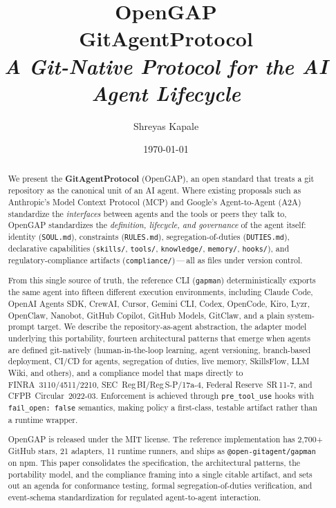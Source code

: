 \documentclass[11pt,a4paper]{article}
\title{\textbf{\Huge OpenGAP} \\[4pt] \large\textbf{GitAgentProtocol} \\[4pt] \normalsize\textit{A Git-Native Protocol for the AI Agent Lifecycle}}
\author[1]{Shreyas Kapale}
\affil[1]{OpenGAP Working Group \\ \texttt{shreyas@lyzr.ai} \\ \href{https://gitagent.sh}{gitagent.sh} \\ \href{https://github.com/open-gitagent/gitagent}{github.com/open-gitagent/gitagent}}
\date{\today}
\begin{document}
\maketitle

\begin{abstract}
\noindent
We present the \textbf{GitAgentProtocol} (OpenGAP), an open standard that treats a
git repository as the canonical unit of an AI agent. Where existing proposals such as
Anthropic's Model Context Protocol (MCP) and Google's Agent-to-Agent (A2A) standardize
the \emph{interfaces} between agents and the tools or peers they talk to, OpenGAP
standardizes the \emph{definition, lifecycle, and governance} of the agent itself:
identity (\texttt{SOUL.md}), constraints (\texttt{RULES.md}), segregation-of-duties
(\texttt{DUTIES.md}), declarative capabilities (\texttt{skills/}, \texttt{tools/},
\texttt{knowledge/}, \texttt{memory/}, \texttt{hooks/}), and regulatory-compliance
artifacts (\texttt{compliance/})\,---\,all as files under version control.

From this single source of truth, the reference CLI (\texttt{gapman}) deterministically
exports the same agent into fifteen different execution environments, including Claude
Code, OpenAI Agents SDK, CrewAI, Cursor, Gemini CLI, Codex, OpenCode, Kiro, Lyzr,
OpenClaw, Nanobot, GitHub Copilot, GitHub Models, GitClaw, and a plain system-prompt
target. We describe the repository-as-agent abstraction, the adapter model underlying
this portability, fourteen architectural patterns that emerge when agents are defined
git-natively (human-in-the-loop learning, agent versioning, branch-based deployment,
CI/CD for agents, segregation of duties, live memory, SkillsFlow, LLM Wiki, and others),
and a compliance model that maps directly to FINRA~3110/4511/2210,
SEC~Reg\,BI/Reg\,S-P/17a-4, Federal Reserve~SR\,11-7, and CFPB~Circular~2022-03.
Enforcement is achieved through \texttt{pre\_tool\_use} hooks with \texttt{fail\_open:
false} semantics, making policy a first-class, testable artifact rather than a runtime
wrapper.

OpenGAP is released under the MIT license. The reference implementation has 2{,}700+
GitHub stars, 21 adapters, 11 runtime runners, and ships as
\texttt{@open-gitagent/gapman} on npm. This paper consolidates the specification, the
architectural patterns, the portability model, and the compliance framing into a single
citable artifact, and sets out an agenda for conformance testing, formal
segregation-of-duties verification, and event-schema standardization for regulated
agent-to-agent interaction.
\end{abstract}
\end{document}
